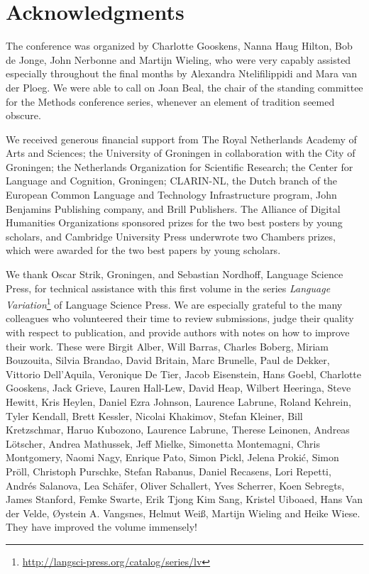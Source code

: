 \documentclass[output=paper]{LSP/langsci}
\begin{document}
\section*{Acknowledgments}

The conference was organized by Charlotte Gooskens, Nanna Haug Hilton, Bob de Jonge, John Nerbonne and Martijn Wieling, who were very capably assisted especially throughout the final months by Alexandra Ntelifilippidi and Mara van der Ploeg. We were able to call on Joan Beal, the chair of the standing committee for the Methods conference series, whenever an element of tradition seemed obscure.

We received generous financial support from The Royal Netherlands Academy of Arts and Sciences; the University of Groningen in collaboration with the City of Groningen; the Netherlands Organization for Scientific Research; the Center for Language and Cognition, Groningen; CLARIN-NL, the Dutch branch of the European Common Language and Technology Infrastructure program, John Benjamins Publishing company, and Brill Publishers. The Alliance of Digital Humanities Organizations sponsored prizes for the two best posters by young scholars, and Cambridge University Press underwrote two Chambers prizes, which were awarded for the two best papers by young scholars. 

We thank Oscar Strik, Groningen, and Sebastian Nordhoff, Language Science Press, for technical assistance with this first volume in the series \textit{Language Variation}\footnote{\url{http://langsci-press.org/catalog/series/lv}} of Language Science Press. We are especially grateful to the many colleagues who volunteered their time to review submissions, judge their quality with respect to publication, and provide authors with notes on how to improve their work. These were Birgit Alber, Will Barras, Charles Boberg, Miriam Bouzouita, Silvia Brandao, David Britain, Marc Brunelle, Paul de Dekker, Vittorio Dell'Aquila, Veronique De Tier, Jacob Eisenstein, Hans Goebl, Charlotte Gooskens, Jack Grieve, Lauren Hall-Lew, David Heap, Wilbert Heeringa, Steve Hewitt, Kris Heylen, Daniel Ezra Johnson, Laurence Labrune, Roland Kehrein, Tyler Kendall, Brett Kessler, Nicolai Khakimov, Stefan Kleiner, Bill Kretzschmar, Haruo Kubozono, Laurence Labrune, Therese Leinonen, Andreas Lötscher, Andrea Mathussek, Jeff Mielke, Simonetta Montemagni, Chris Montgomery, Naomi Nagy, Enrique Pato, Simon Pickl, Jelena Prokić, Simon Pröll, Christoph Purschke, Stefan Rabanus, Daniel Recasens, Lori Repetti, Andrés Salanova, Lea Schäfer, Oliver Schallert, Yves Scherrer, Koen Sebregts, James Stanford, Femke Swarte, Erik Tjong Kim Sang, Kristel Uiboaed, Hans Van der Velde, Øystein A. Vangsnes, Helmut Weiß, Martijn Wieling and Heike Wiese. They have improved the volume immensely!


\printbibliography[heading=subbibliography,notkeyword=this]
\end{document}
